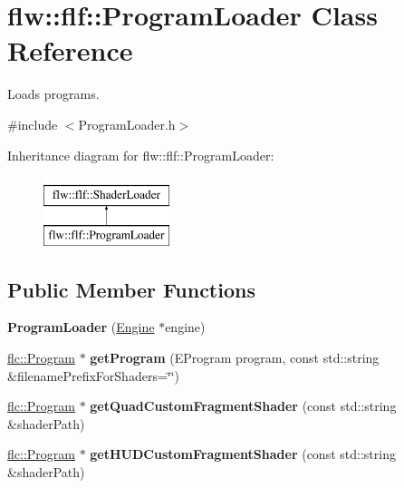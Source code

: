 \hypertarget{classflw_1_1flf_1_1ProgramLoader}{}\section{flw\+:\+:flf\+:\+:Program\+Loader Class Reference}
\label{classflw_1_1flf_1_1ProgramLoader}


Loads programs.  




{\ttfamily \#include $<$Program\+Loader.\+h$>$}

Inheritance diagram for flw\+:\+:flf\+:\+:Program\+Loader\+:\begin{figure}[H]
\begin{center}
\leavevmode
\includegraphics[height=2.000000cm]{classflw_1_1flf_1_1ProgramLoader}
\end{center}
\end{figure}
\subsection*{Public Member Functions}
\begin{DoxyCompactItemize}
\item 
\mbox{\label{classflw_1_1flf_1_1ProgramLoader_ace9eeecd15a96c89393d055ffcd39342}} 
{\bfseries Program\+Loader} (\hyperlink{classflw_1_1Engine}{Engine} $\ast$engine)
\item 
\mbox{\label{classflw_1_1flf_1_1ProgramLoader_a8960adda50f3e217ea68e18c1a79b14a}} 
\hyperlink{classflw_1_1flc_1_1Program}{flc\+::\+Program} $\ast$ {\bfseries get\+Program} (E\+Program program, const std\+::string \&filename\+Prefix\+For\+Shaders=\char`\"{}\char`\"{})
\item 
\mbox{\label{classflw_1_1flf_1_1ProgramLoader_a46dd25f6746abd4b7287b9baed280334}} 
\hyperlink{classflw_1_1flc_1_1Program}{flc\+::\+Program} $\ast$ {\bfseries get\+Quad\+Custom\+Fragment\+Shader} (const std\+::string \&shader\+Path)
\item 
\mbox{\label{classflw_1_1flf_1_1ProgramLoader_ae8ba0d5317ab228b612f6a33395a0c56}} 
\hyperlink{classflw_1_1flc_1_1Program}{flc\+::\+Program} $\ast$ {\bfseries get\+H\+U\+D\+Custom\+Fragment\+Shader} (const std\+::string \&shader\+Path)
\end{DoxyCompactItemize}
